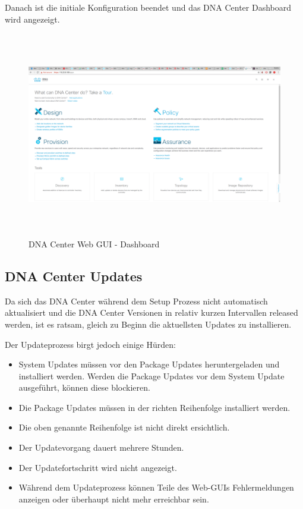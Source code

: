 Danach ist die initiale Konfiguration beendet und das DNA Center Dashboard wird angezeigt.

\begin{figure}[H]
	\centering
	\includegraphics[height=9cm]{img/sc_008.png}
	\caption{DNA Center Web GUI - Dashboard}
	\label{fig:dna-center-gui-4}
\end{figure}

\subsection{DNA Center Updates}
\label{DNACenter_Updates}
Da sich das DNA Center während dem Setup Prozess nicht automatisch aktualisiert und die DNA Center Versionen in relativ kurzen Intervallen released werden, ist es ratsam, gleich zu Beginn die aktuellsten Updates zu installieren.

Der Updateprozess birgt jedoch einige Hürden:
\begin{itemize}
	\item System Updates müssen vor den Package Updates heruntergeladen und installiert werden.
	\subitem Werden die Package Updates vor dem System Update ausgeführt, können diese blockieren. 
	\item Die Package Updates müssen in der richten Reihenfolge installiert werden.
	\item Die oben genannte Reihenfolge ist nicht direkt ersichtlich.
	\item Der Updatevorgang dauert mehrere Stunden.
	\item Der Updatefortschritt wird nicht angezeigt. 
	\item Während dem Updateprozess können Teile des Web-GUIs Fehlermeldungen anzeigen oder überhaupt nicht mehr erreichbar sein.\\
\end{itemize} 


